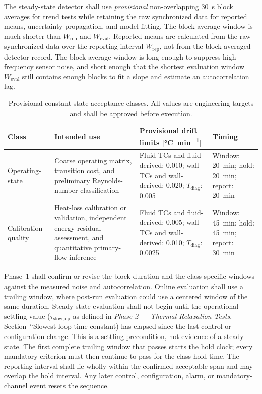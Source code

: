 \documentclass[11pt]{article}
\newcommand{\Tdiag}{T_{\mathrm{diag}}}
\newcommand{\PhaseTwoDoc}{\textit{Phase 2 --- Thermal Relaxation Tests}}
\begin{document}
The steady-state detector shall use \emph{provisional} non-overlapping \SI{30}{s} block averages for trend tests while retaining the raw synchronized data for reported means, uncertainty propagation, and model fitting. The block average window is much shorter than $W_{\mathrm{rep}}$ and $W_{\mathrm{eval}}$. Reported means are calculated from the raw synchronized data over the reporting interval $W_{\mathrm{rep}}$, not from the block-averaged detector record. The block average window is long enough to suppress high-frequency sensor noise, and short enough that the shortest evaluation window $W_{\mathrm{eval}}$ still contains enough blocks to fit a slope and estimate an autocorrelation lag. 

\begin{table}[H]
\centering
\caption{Provisional constant-state acceptance classes. All values are engineering targets and shall be approved before execution.}
\label{tab:ss_classes}
{\small
\setlength{\tabcolsep}{4.5pt}
\begin{tabularx}{\textwidth}{@{}>{\raggedright\arraybackslash}p{0.98in}>{\raggedright\arraybackslash}X>{\raggedright\arraybackslash}p{1.42in}>{\raggedright\arraybackslash}p{1.30in}@{}}
\toprule
\textbf{Class} & \textbf{Intended use} & \textbf{Provisional drift limits [\si{\degreeCelsius\per min}]} & \textbf{Timing} \\
\midrule
Operating-state & Coarse operating matrix, transition cost, and preliminary Reynolds-number classification & Fluid TCs and fluid-derived: \num{0.010}; wall TCs and wall-derived: \num{0.020}; $\Tdiag$: \num{0.005} & Window: \SI{20}{min}; hold: \SI{20}{min}; report: \SI{20}{min} \\
\addlinespace
Calibration-quality & Heat-loss calibration or validation, independent energy-residual assessment, and quantitative primary-flow inference & Fluid TCs and fluid-derived: \num{0.005}; wall TCs and wall-derived: \num{0.010}; $\Tdiag$: \num{0.0025} & Window: \SI{45}{min}; hold: \SI{45}{min}; report: \SI{30}{min} \\
\bottomrule
\end{tabularx}}
\end{table}

Phase~1 shall confirm or revise the block duration and the class-specific windows against the measured noise and autocorrelation. Online evaluation shall use a trailing window, where post-run evaluation could use a centered window of the same duration. Steady-state evaluation shall not begin until the operational settling value ($\tau_{\mathrm{slow,op}}$ as defined in \PhaseTwoDoc, Section~``Slowest loop time constant) has elapsed since the last control or configuration change. This is a settling precondition, not evidence of a steady-state. The first complete trailing window that passes starts the hold clock; every mandatory criterion must then continue to pass for the class hold time. The reporting interval shall lie wholly within the confirmed acceptable span and may overlap the hold interval. Any later control, configuration, alarm, or mandatory-channel event resets the sequence.
\end{document}
